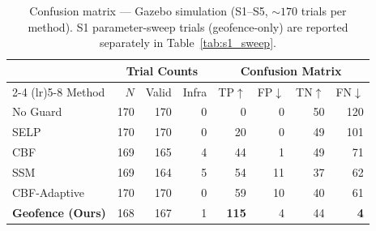 
\begin{table}[t]
\centering
\caption{Confusion matrix --- Gazebo simulation (S1--S5, ${\sim}170$
  trials per method). S1 parameter-sweep trials (geofence-only) are
  reported separately in Table~\ref{tab:s1_sweep}.}
\label{tab:confusion}
\begin{tabular}{@{}l rrr rrrr@{}}
\toprule
& \multicolumn{3}{c}{Trial Counts} & \multicolumn{4}{c}{Confusion Matrix} \\
\cmidrule(lr){2-4} \cmidrule(lr){5-8}
Method & $N$ & Valid & Infra & TP$\uparrow$ & FP$\downarrow$ & TN$\uparrow$ & FN$\downarrow$ \\
\midrule
No Guard          & 170 & 170 & 0 &   0 &  0 & 50 & 120 \\
SELP              & 170 & 170 & 0 &  20 &  0 & 49 & 101 \\
CBF               & 169 & 165 & 4 &  44 &  1 & 49 &  71 \\
SSM               & 169 & 164 & 5 &  54 & 11 & 37 &  62 \\
CBF-Adaptive      & 170 & 170 & 0 &  59 & 10 & 40 &  61 \\
\textbf{Geofence (Ours)} & 168 & 167 & 1 & \textbf{115} & 4 & 44 & \textbf{4} \\
\bottomrule
\end{tabular}
\end{table}

